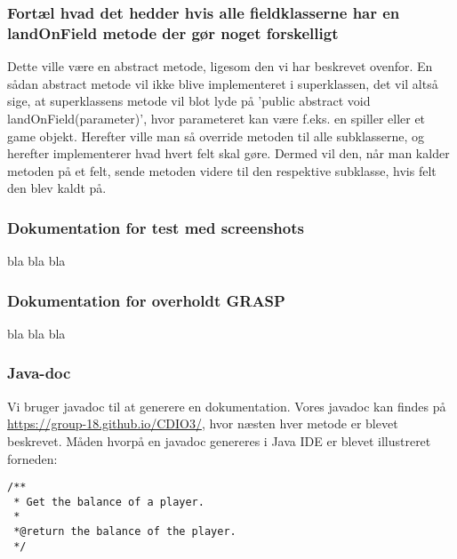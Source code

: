 \subsubsection{Fortæl hvad det hedder hvis alle fieldklasserne har en landOnField metode der gør noget forskelligt}
Dette ville være en abstract metode, ligesom den vi har beskrevet ovenfor. En sådan abstract metode vil ikke blive implementeret i superklassen, det vil altså sige, at superklassens metode vil blot lyde på 'public abstract void landOnField(parameter)', hvor parameteret kan være f.eks. en spiller eller et game objekt. Herefter ville man så override metoden til alle subklasserne, og herefter implementerer hvad hvert felt skal gøre. Dermed vil den, når man kalder metoden på et felt, sende metoden videre til den respektive subklasse, hvis felt den blev kaldt på.

\subsubsection{Dokumentation for test med screenshots}
bla bla bla

\subsubsection{Dokumentation for overholdt GRASP}
bla bla bla

\subsubsection{Java-doc}
Vi bruger javadoc til at generere en dokumentation. Vores javadoc kan findes på \url{https://group-18.github.io/CDIO3/}, hvor næsten hver metode er blevet beskrevet.
Måden hvorpå en javadoc genereres i Java IDE er blevet illustreret forneden:
\begin{lstlisting}
/**
 * Get the balance of a player.
 *
 *@return the balance of the player.
 */
\end{lstlisting}